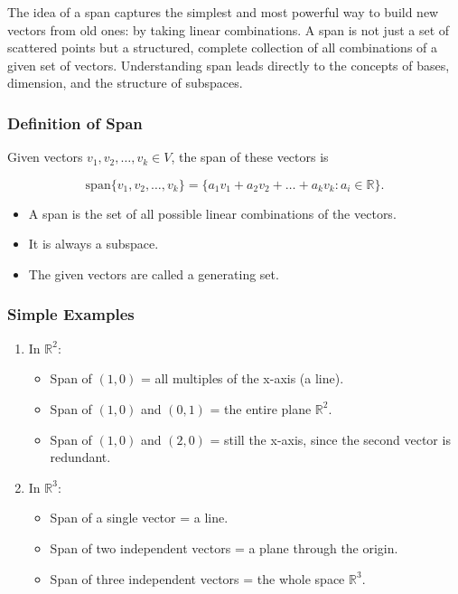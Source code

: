 \documentclass[
  letterpaper,
  DIV=11,
  numbers=noendperiod]{scrreprt}
\providecommand{\tightlist}{%
  \setlength{\itemsep}{0pt}\setlength{\parskip}{0pt}}
\begin{document}
The idea of a span captures the simplest and most powerful way to build
new vectors from old ones: by taking linear combinations. A span is not
just a set of scattered points but a structured, complete collection of
all combinations of a given set of vectors. Understanding span leads
directly to the concepts of bases, dimension, and the structure of
subspaces.

\subsubsection{Definition of Span}\label{definition-of-span}

Given vectors \(v_1, v_2, \dots, v_k \in V\), the span of these vectors
is

\[
\text{span}\{v_1, v_2, \dots, v_k\} = \{a_1 v_1 + a_2 v_2 + \dots + a_k v_k : a_i \in \mathbb{R}\}.
\]

\begin{itemize}
\tightlist
\item
  A span is the set of all possible linear combinations of the vectors.
\item
  It is always a subspace.
\item
  The given vectors are called a generating set.
\end{itemize}

\subsubsection{Simple Examples}\label{simple-examples}

\begin{enumerate}
\def\labelenumi{\arabic{enumi}.}
\item
  In \(\mathbb{R}^2\):

  \begin{itemize}
  \tightlist
  \item
    Span of \((1,0)\) = all multiples of the x-axis (a line).
  \item
    Span of \((1,0)\) and \((0,1)\) = the entire plane \(\mathbb{R}^2\).
  \item
    Span of \((1,0)\) and \((2,0)\) = still the x-axis, since the second
    vector is redundant.
  \end{itemize}
\item
  In \(\mathbb{R}^3\):

  \begin{itemize}
  \tightlist
  \item
    Span of a single vector = a line.
  \item
    Span of two independent vectors = a plane through the origin.
  \item
    Span of three independent vectors = the whole space
    \(\mathbb{R}^3\).
  \end{itemize}
\end{enumerate}
\end{document}
